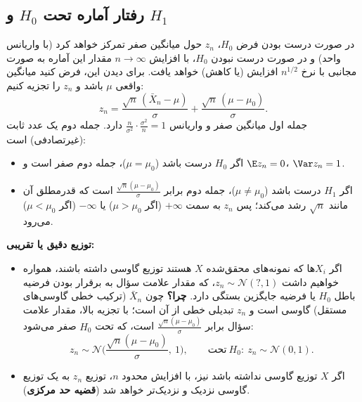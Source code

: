 \subsection{رفتار آماره تحت $H_0$ و $H_1$}
در صورت درست بودن فرض $H_0$، $z_n$ حول میانگین صفر تمرکز خواهد کرد (با واریانس واحد) و در صورت درست نبودن $H_0$، با افزایش $n\to\infty$ مقدار این آماره به صورت مجانبی با نرخ $n^{1/2}$ افزایش (یا کاهش) خواهد یافت. برای دیدن این، فرض کنید میانگین واقعی $\mu$ باشد و $z_n$ را تجزیه کنیم:
\[
z_n=\frac{\sqrt n\,(\bar X_n-\mu)}{\sigma}+\frac{\sqrt n\,(\mu-\mu_0)}{\sigma}.
\]
جمله اول میانگین صفر و واریانس $\frac{n}{\sigma^2}\cdot\frac{\sigma^2}{n}=1$ دارد. جمله دوم یک عدد ثابت (غیرتصادفی) است:
\begin{itemize}
\item اگر $H_0$ درست باشد ($\mu=\mu_0$)، جمله دوم صفر است و $\E z_n=0$، $\Var z_n=1$.
\item اگر $H_1$ درست باشد ($\mu\neq\mu_0$)، جمله دوم برابر $\frac{\sqrt n(\mu-\mu_0)}{\sigma}$ است که قدرمطلق آن مانند $\sqrt n$ رشد می‌کند؛ پس $z_n$ به سمت $+\infty$ (اگر $\mu>\mu_0$) یا $-\infty$ (اگر $\mu<\mu_0$) می‌رود.
\end{itemize}

\textbf{توزیع دقیق یا تقریبی:}
\begin{itemize}
\item اگر $X_i$ها که نمونه‌های محقق‌شده $X$ هستند توزیع گاوسی داشته باشند، همواره خواهیم داشت $z_n\sim\mathcal N(?,1)$، که مقدار علامت سؤال به برقرار بودن فرضیه باطل $H_0$ یا فرضیه جایگزین بستگی دارد. \textbf{چرا؟} چون $\bar X_n$ (ترکیب خطی گاوسی‌های مستقل) گاوسی است و $z_n$ تبدیلی خطی از آن است؛ با تجزیه بالا، مقدار علامت سؤال برابر $\frac{\sqrt n(\mu-\mu_0)}{\sigma}$ است، که تحت $H_0$ صفر می‌شود:
\[
z_n\sim\mathcal N\Big(\frac{\sqrt n(\mu-\mu_0)}{\sigma},\ 1\Big),\qquad\text{تحت}\ H_0:\ z_n\sim\mathcal N(0,1).
\]
\item اگر $X$ توزیع گاوسی نداشته باشد نیز، با افزایش محدود $n$، توزیع $z_n$ به یک توزیع گاوسی نزدیک و نزدیک‌تر خواهد شد (\textbf{قضیه حد مرکزی}).
\end{itemize}

